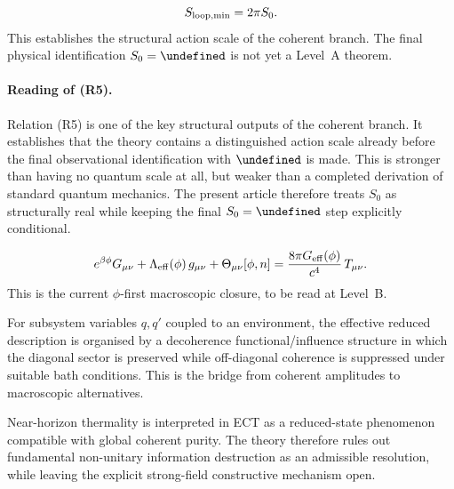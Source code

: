 \documentclass[11pt,a4paper]{article}
\let\hbar\undefined
\numberwithin{equation}{section}
\begin{document}
\begin{description}[leftmargin=1.2em, labelindent=0pt, style=unboxed]
\item[\textbf{(R5) Minimal coherent loop action.}]
\begin{equation}
  S_{\rm loop,min}=2\pi S_0.
\end{equation}
This establishes the structural action scale of the coherent branch.
The final physical identification $S_0=\hbar$ is not yet a Level~A
theorem.

\paragraph{Reading of (R5).}
Relation (R5) is one of the key structural outputs of the coherent
branch.
It establishes that the theory contains a distinguished action scale
already before the final observational identification with $\hbar$ is
made.
This is stronger than having no quantum scale at all, but weaker than a
completed derivation of standard quantum mechanics.
The present article therefore treats $S_0$ as structurally real while
keeping the final $S_0=\hbar$ step explicitly conditional.

\item[\textbf{(R6) Effective macroscopic closure.}]
\begin{equation}
  e^{\beta\phi} G_{\mu\nu}
  + \Lambda_{\rm eff}(\phi)\,g_{\mu\nu}
  + \Theta_{\mu\nu}[\phi,n]
  = \frac{8\pi G_{\rm eff}(\phi)}{c^4}\,T_{\mu\nu}.
\end{equation}
This is the current $\phi$-first macroscopic closure, to be read at
Level~B.

\item[\textbf{(R7) Reduced-state decoherence logic.}]
For subsystem variables $q,q'$ coupled to an environment,
the effective reduced description is organised by a decoherence
functional/influence structure in which the diagonal sector is preserved
while off-diagonal coherence is suppressed under suitable bath
conditions.
This is the bridge from coherent amplitudes to macroscopic alternatives.

\item[\textbf{(R8) Horizon thermality without fundamental information
destruction.}]
Near-horizon thermality is interpreted in ECT as a reduced-state
phenomenon compatible with global coherent purity.
The theory therefore rules out fundamental non-unitary information
destruction as an admissible resolution, while leaving the explicit
strong-field constructive mechanism open.


\end{description}
\end{document}
